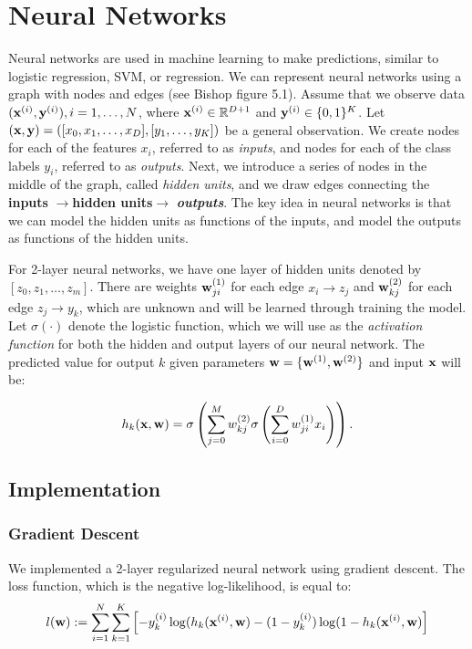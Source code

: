 
\section{Neural Networks}\label{sec:neural_networks}

Neural networks are used in machine learning to make predictions, similar to logistic regression, SVM, or regression.  We can represent neural networks using a graph with nodes and edges (see Bishop figure 5.1).  Assume that we observe data $(\boldsymbol{\mathbf{x}}^{(i)},\boldsymbol{\mathbf{y}}^{(i)}), i = 1, \ldots, N$,  where $\boldsymbol{\mathbf{x}}^{(i)} \in \mathbb{R}^{D+1}$ and $\boldsymbol{\mathbf{y}}^{(i)} \in \{0,1\}^K$.  Let $(\boldsymbol{\mathbf{x}},\boldsymbol{\mathbf{y}}) = ([x_0, x_1, \ldots, x_D],[y_1, \ldots, y_K])$ be a general observation.  We create nodes for each of the features $x_i$, referred to as \emph{inputs}, and nodes for each of the class labels $y_i$, referred to as \emph{outputs}.  Next, we introduce a series of nodes in the middle of the graph, called \emph{hidden units}, and we draw edges connecting the {\bf inputs} $\rightarrow ${\bf hidden units}$ \rightarrow$ \emph{\bf outputs}.  The key idea in neural networks is that we can model the hidden units as functions of the inputs, and model the outputs as functions of the hidden units.   

For 2-layer neural networks, we have one layer of hidden units denoted by $[z_0, z_1,\ldots, z_m]$.   There are weights $\boldsymbol{\mathbf{w}}^{(1)}_{ji}$ for each edge $x_i \rightarrow z_j$ and $\boldsymbol{\mathbf{w}}^{(2)}_{kj}$ for each edge $z_j \rightarrow y_k$, which are unknown and will be learned through training the model.  Let $\sigma(\cdot)$ denote the logistic function, which we will use as the \emph{activation function} for both the hidden and output layers of our neural network.  The predicted value for output $k$ given parameters $\boldsymbol{\mathbf{w}} = \{\boldsymbol{\mathbf{w}}^{(1)}, \boldsymbol{\mathbf{w}}^{(2)}\}$ and input $\boldsymbol{\mathbf{x}}$ will be:

\begin{equation}
h_{k}(\boldsymbol{\mathbf{x}},\boldsymbol{\mathbf{w}}) = \sigma\left(\sum_{j=0}^{M} w^{(2)}_{kj} \sigma\left(\sum_{i=0}^{D} w^{(1)}_{ji} x_i\right)\right).
\end{equation}

\subsection{Implementation}

\subsubsection{Gradient Descent}
We implemented a 2-layer regularized neural network using gradient descent.  The loss function, which is the negative log-likelihood, is equal to:
\begin{equation}
l(\boldsymbol{\mathbf{w}}) := \sum_{i=1}^{N} \sum_{k=1}^{K} \left[ -y_k^{(i)} \log(h_{k}(\boldsymbol{\mathbf{x}}^{(i)}, \boldsymbol{\mathbf{w}}) - (1-y_k^{(i)}) \log(1 - h_{k}(\boldsymbol{\mathbf{x}}^{(i)}, \boldsymbol{\mathbf{w}})\right]
\end{equation}


